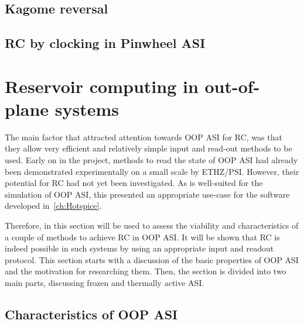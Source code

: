 \subsection{Kagome reversal} %
\subsection{RC by clocking in Pinwheel ASI}

\section{Reservoir computing in out-of-plane systems}
The main factor that attracted attention towards OOP ASI for RC, was that they allow very efficient and relatively simple input and read-out methods to be used.
Early on in the \spinengine project, methods to read the state of OOP ASI had already been demonstrated experimentally on a small scale by ETHZ/PSI.
However, their potential for RC had not yet been investigated.
As \hotspice is well-suited for the simulation of OOP ASI, this presented an appropriate use-case for the software developed in~\cref{ch:Hotspice}. %
\par
Therefore, in this section \hotspice will be used to assess the viability and characteristics of a couple of methods to achieve RC in OOP ASI.
It will be shown that RC is indeed possible in such systems by using an appropriate input and readout protocol.
This section starts with a discussion of the basic properties of OOP ASI and the motivation for researching them.
Then, the section is divided into two main parts, discussing frozen and thermally active ASI. %
\subsection{Characteristics of OOP ASI}
